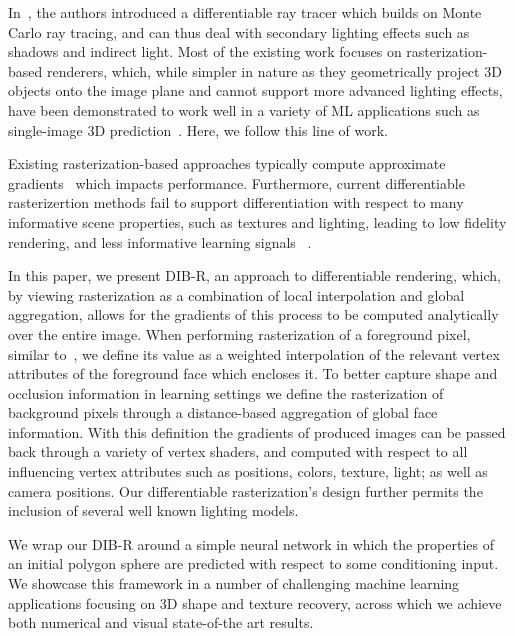\documentclass{article}
\newcommand{\model}{DIB-R}
\begin{document}
In~\cite{li2018differentiable}, the authors introduced a differentiable ray tracer which builds on Monte Carlo ray tracing, and can thus deal with secondary lighting effects such as shadows and indirect light. Most of the existing work focuses on rasterization-based renderers, which, while simpler in nature as they geometrically project 3D objects onto the image plane and cannot support more advanced lighting effects, have been demonstrated to work well in a variety of ML applications such as single-image 3D prediction~\cite{loper2014opendr,NMR,liu2019soft, liu2019soft_v2}. Here, we follow this line of work.

Existing rasterization-based approaches typically compute approximate gradients~\cite{loper2014opendr,NMR} which impacts performance. Furthermore, current differentiable rasterizertion methods fail to support differentiation with respect to many informative scene properties, such as textures and lighting, leading to low fidelity rendering, and less informative learning signals~\cite{NMR, liu2019soft, liu2019soft_v2} . 


\iffalse


\fi

In this paper, we present {\model }, an approach to differentiable rendering, which, by viewing rasterization as a combination of local interpolation and global aggregation, allows for the gradients of this process to be computed analytically over the entire image. When performing rasterization of a foreground pixel, similar to~\cite{genova2018unsupervised}, we define its value as a weighted interpolation of the relevant vertex attributes of the foreground face which encloses it. To better capture shape and occlusion information in learning settings we define the rasterization of background pixels through a distance-based aggregation of global face information. With this definition the gradients of produced images can be passed back through a variety of vertex shaders, and computed with respect to all influencing vertex attributes such as positions, colors, texture, light; as well as camera positions. Our differentiable rasterization's design further permits the inclusion of several well known lighting models. 





We wrap our {\model } around a simple neural network in which the properties of an initial polygon sphere are predicted with respect to some conditioning input. We showcase this framework in a number of challenging machine learning applications focusing on 3D shape and texture recovery, across which we achieve both numerical and visual state-of-the art results. 
\end{document}
